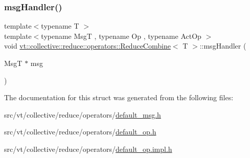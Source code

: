 \mbox{\label{structvt_1_1collective_1_1reduce_1_1operators_1_1_reduce_combine_aa1657dc492475bc1d82d1dc282ee37ce}} 
\subsubsection{\texorpdfstring{msg\+Handler()}{msgHandler()}}
{\footnotesize\ttfamily template$<$typename T $>$ \\
template$<$typename MsgT , typename Op , typename Act\+Op $>$ \\
void \hyperlink{structvt_1_1collective_1_1reduce_1_1operators_1_1_reduce_combine}{vt\+::collective\+::reduce\+::operators\+::\+Reduce\+Combine}$<$ T $>$\+::msg\+Handler (\begin{DoxyParamCaption}\item[{MsgT $\ast$}]{msg }\end{DoxyParamCaption})\hspace{0.3cm}{\ttfamily [static]}}



The documentation for this struct was generated from the following files\+:\begin{DoxyCompactItemize}
\item 
src/vt/collective/reduce/operators/\hyperlink{default__msg_8h}{default\+\_\+msg.\+h}\item 
src/vt/collective/reduce/operators/\hyperlink{default__op_8h}{default\+\_\+op.\+h}\item 
src/vt/collective/reduce/operators/\hyperlink{default__op_8impl_8h}{default\+\_\+op.\+impl.\+h}\end{DoxyCompactItemize}
